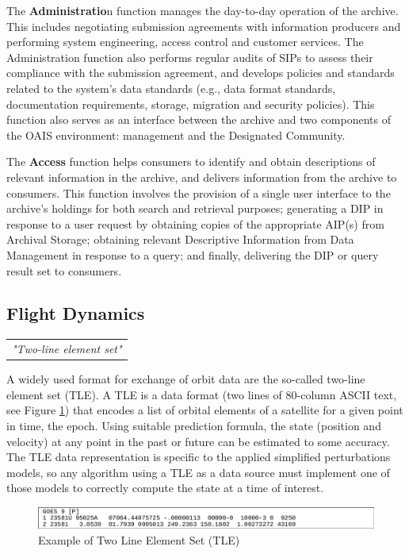 The \textbf{Administratio}n function manages the day-to-day operation of the archive. This includes negotiating submission agreements with information producers and performing system engineering, access control and customer services. The Administration function also performs regular audits of SIPs to assess their compliance with the submission agreement, and develops policies and standards related to the system's data standards (e.g., data format standards, documentation requirements, storage, migration and security policies). This function also serves as an interface between the archive and two components of the OAIS environment: management and the Designated Community.

The \textbf{Access} function helps consumers to identify and obtain descriptions of relevant information in the archive, and delivers information from the archive to consumers. This function involves the provision of a single user interface to the archive's holdings for both search and retrieval purposes; generating a DIP in response to a user request by obtaining copies of the appropriate AIP(s) from Archival Storage; obtaining relevant Descriptive Information from Data Management in response to a query; and finally, delivering the DIP or query result set to consumers.

\subsection{Flight Dynamics}

\begin{tabular}{l}
\textit{"Two-line element set" \cite{wiki-TLE}} \\
\end{tabular}

A widely used format for exchange of orbit data are the so-called two-line element set (TLE). A TLE is a data format (two lines of 80-column ASCII text, see Figure \ref{fig:Example of Two Line Element Set}) that encodes a list of orbital elements of a satellite for a given point in time, the epoch. Using suitable prediction formula, the state (position and velocity) at any point in the past or future can be estimated to some accuracy. The TLE data representation is specific to the applied simplified perturbations models, so any algorithm using a TLE as a data source must implement one of those models to correctly compute the state at a time of interest.

\begin{figure}[h]
\centering\includegraphics[scale=0.35]{fig/example_of_tle}
\caption{Example of Two Line Element Set (TLE)}
\label{fig:Example of Two Line Element Set}
\end{figure}

